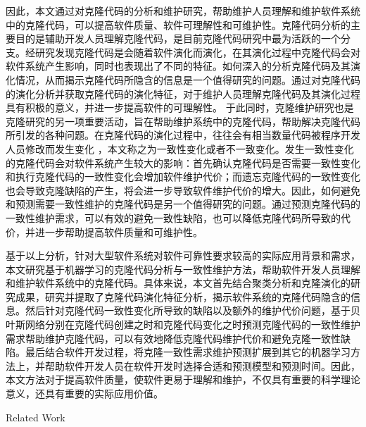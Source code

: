 因此，本文通过对克隆代码的分析和维护研究，帮助维护人员理解和维护软件系统中的克隆代码，可以提高软件质量、软件可理解性和可维护性。克隆代码分析的主要目的是辅助开发人员理解克隆代码，是目前克隆代码研究中最为活跃的一个分支。经研究发现克隆代码是会随着软件演化而演化\cite{kim2005empirical}\cite{saha2011automatic}，在其演化过程中克隆代码会对软件系统产生影响，同时也表现出了不同的特征\cite{gode2011frequency}\cite{mondal2012dispersion}\cite{rahman2014change}。如何深入的分析克隆代码及其演化情况，从而揭示克隆代码所隐含的信息是一个值得研究的问题。通过对克隆代码的演化分析并获取克隆代码的演化特征，对于维护人员理解克隆代码及其演化过程具有积极的意义，并进一步提高软件的可理解性。
于此同时，克隆维护研究也是克隆研究的另一项重要活动，旨在帮助维护系统中的克隆代码，帮助解决克隆代码所引发的各种问题。在克隆代码的演化过程中，往往会有相当数量代码被程序开发人员修改而发生变化\cite{krinke2007study}\cite{aversano2007clones} ，本文称之为一致性变化或者不一致变化。发生一致性变化的克隆代码会对软件系统产生较大的影响：首先确认克隆代码是否需要一致性变化和执行克隆代码的一致性变化会增加软件维护代价；而遗忘克隆代码的一致性变化也会导致克隆缺陷的产生\cite{juergens2009code}\cite{wagner2016relationship}，将会进一步导致软件维护代价的增大。因此，如何避免和预测需要一致性维护的克隆代码是另一个值得研究的问题。通过预测克隆代码的一致性维护需求，可以有效的避免一致性缺陷，也可以降低克隆代码所导致的代价，并进一步帮助提高软件质量和可维护性。

基于以上分析，针对大型软件系统对软件可靠性要求较高的实际应用背景和需求，本文研究基于机器学习的克隆代码分析与一致性维护方法，帮助软件开发人员理解和维护软件系统中的克隆代码。具体来说，本文首先结合聚类分析和克隆演化的研究成果，研究并提取了克隆代码演化特征分析，揭示软件系统的克隆代码隐含的信息。然后针对克隆代码一致性变化所导致的缺陷以及额外的维护代价问题，基于贝叶斯网络分别在克隆代码创建之时和克隆代码变化之时预测克隆代码的一致性维护需求帮助维护克隆代码，可以有效地降低克隆代码维护代价和避免克隆一致性缺陷。最后结合软件开发过程，将克隆一致性需求维护预测扩展到其它的机器学习方法上，并帮助软件开发人员在软件开发时选择合适和预测模型和预测时间。因此，本文方法对于提高软件质量，使软件更易于理解和维护，不仅具有重要的科学理论意义，还具有重要的实际应用价值。


{Related Work}

